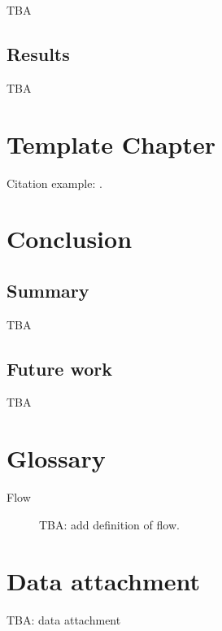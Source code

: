 \documentclass[
    digital,
    color,
    11pt,
    nocover,
    table,  %
    nolof,  %
    nolot,  %
    microtype,
]{fithesis3}
\begin{document}
TBA


\section{Results}

TBA



\chapter{Template Chapter}
\label{chap:template}

Citation example: \cite{adaptive-practice}.


\chapter{Conclusion}
\label{chap:conclusion}

\section{Summary}
\label{sec:conclusion.summary}

TBA

\section{Future work}
\label{sec:conclusion.future-work}

TBA



\printbibliography[heading=bibintoc]

\appendix

\chapter{Glossary}
\label{chap:glossary}

\begin{description}
    \item[Flow] TBA: add definition of flow.
\end{description}

\chapter{Data attachment}
\label{chap:data}

TBA: data attachment
\end{document}
